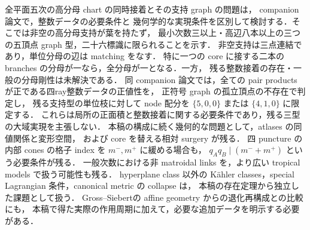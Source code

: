 全平面五次の高分母 chart の同時接着とその支持 graph の問題は，
companion 論文\cite{QuinticArithmetic}で，整数データの必要条件と
幾何学的な実現条件を区別して検討する．そこでは非空の高分母支持が葉を持たず，
最小次数三以上・高辺八本以上の三つの五頂点 graph 型，二十六標識に限られることを示す．
非空支持は三点連結であり，単位分母の辺は matching をなす．
特に一つの core に接する二本の branches の分母が一なら，全分母が一となる．一方，
残る整数接着の存在・一般の分母剛性は未解決である．
同 companion 論文では，全ての pair products が正である四ray整数データの正値性を，
正符号 graph の孤立頂点の不存在で判定し，
残る支持型の単位枝に対して node 配分を $\{5,0,0\}$ または $\{4,1,0\}$ に限定する．
これらは局所の正面積と整数接着に関する必要条件であり，残る三型の大域実現を主張しない．
本稿の構成に続く幾何的な問題として，atlases の同値関係と変形空間，
および core を替える相対 surgery が残る．
四 puncture の内部 cones の格子 index を $m^-,m^+$ に緩める場合も，
$q_Aq_B\mid(m^-+m^+)$ という必要条件が残る．
一般次数における非 matroidal links を，より広い tropical models で扱う可能性も残る．
hyperplane class 以外の Kähler classes，special Lagrangian 条件，canonical metric の collapse は，
本稿の存在定理から独立した課題として扱う．
Gross--Siebert\cite{GrossSiebert}の affine geometry からの退化再構成との比較にも，
本稿で得た実際の作用周期に加えて，必要な追加データを明示する必要がある．

